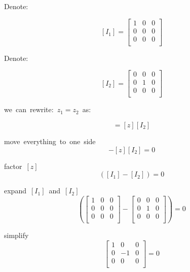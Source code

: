 \documentclass{article}
\begin{document}
\hbox{Denote:}

\[
    [I_1] = \begin{bmatrix}   
    1 & 0 & 0 \\
    0 & 0 & 0 \\
    0 & 0 & 0 \\
    \end{bmatrix}
\]

\hbox{Denote:}

\[
    [I_2] = \begin{bmatrix}   
    0 & 0 & 0 \\
    0 & 1 & 0 \\
    0 & 0 & 0 \\
    \end{bmatrix}
\]

\hbox{we can rewrite: $z_1 = z_2$ as:}

\begin{equation}
    [z][I_1] = [z][I_2]
\end{equation}

\hbox{move everything to one side}
\begin{equation}
    [z][I_1] - [z][I_2] = 0
\end{equation}


\hbox{factor $[z]$}
\begin{equation}
    [z]([I_1] - [I_2]) = 0
\end{equation}

\hbox{expand $[I_1]$ and $[I_2]$}
\begin{equation}
    [z](\begin{bmatrix}   
        1 & 0 & 0 \\
        0 & 0 & 0 \\
        0 & 0 & 0 \\
        \end{bmatrix} 
        - 
        \begin{bmatrix}   
            0 & 0 & 0 \\
            0 & 1 & 0 \\
            0 & 0 & 0 \\
            \end{bmatrix}) = 0
\end{equation}

\hbox{simplify}
\begin{equation}
    [z]\begin{bmatrix}   
        1 & 0 & 0 \\
        0 & -1 & 0 \\
        0 & 0 & 0 \\
        \end{bmatrix} = 0
\end{equation}
\end{document}
